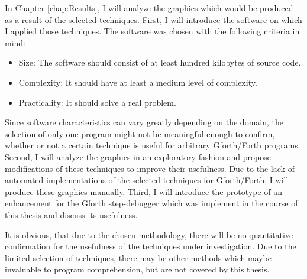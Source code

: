 In Chapter \ref{chap:Results}, I will analyze the graphics which would be produced as a result of the selected techniques.
First, I will introduce the software on which I applied those techniques. The software was chosen with the following criteria in mind:
\begin{itemize}
\item Size: The software should consist of at least hundred kilobytes of source code.
\item Complexity: It should have at least a medium level of complexity.
\item Practicality: It should solve a real problem.
\end{itemize}
Since software characteristics can vary greatly depending on the domain, the selection of only one program might not be meaningful enough to confirm, whether or not a certain technique is useful for arbitrary Gforth/Forth programs.
Second, I will analyze the graphics in an exploratory fashion and propose modifications of these techniques to improve their usefulness. Due to the lack of automated implementations of the selected techniques for Gforth/Forth, I will produce these graphics manually.
Third, I will introduce the prototype of an enhancement for the Gforth step-debugger which was implement in the course of this thesis and discuss its usefulness.

It is obvious, that due to the chosen methodology, there will be no quantitative confirmation for the usefulness of the techniques under investigation. Due to the limited selection of techniques, there may be other methods which maybe invaluable to program comprehension, but are not covered by this thesis.
